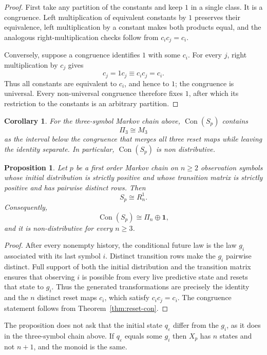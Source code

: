 \documentclass[10pt]{article}
\newtheorem{proposition}[theorem]{Proposition}
\newtheorem{corollary}[theorem]{Corollary}
\theoremstyle{definition}
\theoremstyle{remark}
\newcommand{\Con}{\operatorname{Con}}
\newcommand{\eps}{\varepsilon}
\begin{document}
\begin{proof}
First take any partition of the constants and keep $1$ in a single class.
It is a congruence.  Left multiplication of equivalent constants by $1$ preserves
their equivalence, left multiplication by a constant makes both products equal,
and the analogous right-multiplication checks follow from $c_ic_j=c_i$.

Conversely, suppose a congruence identifies $1$ with some $c_i$.  For every $j$,
right multiplication by $c_j$ gives
\[
  c_j=1c_j\equiv c_ic_j=c_i.
\]
Thus all constants are equivalent to $c_i$, and hence to $1$; the congruence is
universal.  Every non-universal congruence therefore fixes $1$, after which its
restriction to the constants is an arbitrary partition.
\end{proof}

\begin{corollary}
For the three-symbol Markov chain above, $\Con(S_p)$ contains
\[
  \Pi_3\cong M_3
\]
as the interval below the congruence that merges all three reset maps while
leaving the identity separate.  In particular, $\Con(S_p)$ is
non distributive.


\end{corollary}

\begin{proposition}
\label{prop:markov-reset-general}
Let $p$ be a first order Markov chain on $n\ge2$ observation symbols whose
initial distribution is strictly positive and whose transition matrix is strictly positive and has pairwise distinct rows.  Then
\[
  S_p\cong R_n^1.
\]
Consequently,
\[ 
  \Con(S_p)\cong\Pi_n\oplus\mathbf 1,
\]
and it is non-distributive for every $n\ge3$.
\end{proposition}

\begin{proof}
After every nonempty history, the conditional future law is the law $g_i$
associated with its last symbol $i$.  Distinct transition rows make the $g_i$
pairwise distinct.  Full support of both the initial distribution and the
transition matrix ensures that observing $i$ is possible from every live
predictive state and resets that state to $g_i$.  Thus the generated
transformations are precisely the identity and the $n$ distinct reset maps
$c_i$, which satisfy $c_ic_j=c_i$.  The congruence statement follows from
Theorem~\ref{thm:reset-con}.
\end{proof}

The proposition does not ask that the initial state $q_\eps$ differ
from the $g_i$, as it does in the three-symbol chain above.  If
$q_\eps$ equals some $g_i$ then $X_p$ has $n$ states and not $n+1$,
and the monoid is the same.
\end{document}
